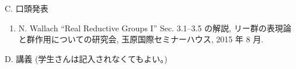 \documentclass[a4j,twocolumn]{jarticle}
\begin{document}

\vspace{0.2cm}
\noindent
C. 口頭発表
\begin{enumerate}
	\item N. Wallach ``Real Reductive Groups I'' Sec. 3.1--3.5 の解説,
		リー群の表現論と群作用についての研究会,
		玉原国際セミナーハウス, 2015 年 8 月.
\end{enumerate}

\vspace{0.1cm}

\vspace{0.2cm}
\noindent
D. 講義 (学生さんは記入されなくてもよい。)

\vspace{0.1cm}



\vspace{0.2cm}
\end{document}
